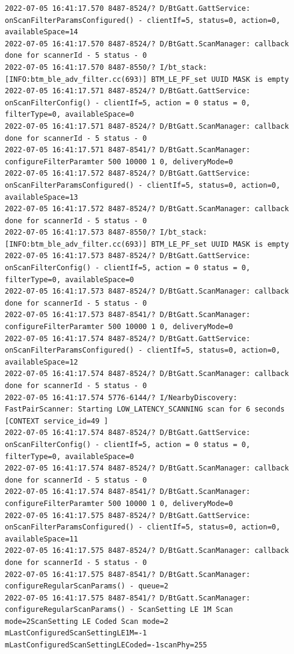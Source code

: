 \documentclass[a4paper,12pt]{book}
\begin{document}
\begin{lstlisting}
2022-07-05 16:41:17.570 8487-8524/? D/BtGatt.GattService: onScanFilterParamsConfigured() - clientIf=5, status=0, action=0, availableSpace=14
2022-07-05 16:41:17.570 8487-8524/? D/BtGatt.ScanManager: callback done for scannerId - 5 status - 0
2022-07-05 16:41:17.570 8487-8550/? I/bt_stack: [INFO:btm_ble_adv_filter.cc(693)] BTM_LE_PF_set UUID MASK is empty 
2022-07-05 16:41:17.571 8487-8524/? D/BtGatt.GattService: onScanFilterConfig() - clientIf=5, action = 0 status = 0, filterType=0, availableSpace=0
2022-07-05 16:41:17.571 8487-8524/? D/BtGatt.ScanManager: callback done for scannerId - 5 status - 0
2022-07-05 16:41:17.571 8487-8541/? D/BtGatt.ScanManager: configureFilterParamter 500 10000 1 0, deliveryMode=0
2022-07-05 16:41:17.572 8487-8524/? D/BtGatt.GattService: onScanFilterParamsConfigured() - clientIf=5, status=0, action=0, availableSpace=13
2022-07-05 16:41:17.572 8487-8524/? D/BtGatt.ScanManager: callback done for scannerId - 5 status - 0
2022-07-05 16:41:17.573 8487-8550/? I/bt_stack: [INFO:btm_ble_adv_filter.cc(693)] BTM_LE_PF_set UUID MASK is empty 
2022-07-05 16:41:17.573 8487-8524/? D/BtGatt.GattService: onScanFilterConfig() - clientIf=5, action = 0 status = 0, filterType=0, availableSpace=0
2022-07-05 16:41:17.573 8487-8524/? D/BtGatt.ScanManager: callback done for scannerId - 5 status - 0
2022-07-05 16:41:17.573 8487-8541/? D/BtGatt.ScanManager: configureFilterParamter 500 10000 1 0, deliveryMode=0
2022-07-05 16:41:17.574 8487-8524/? D/BtGatt.GattService: onScanFilterParamsConfigured() - clientIf=5, status=0, action=0, availableSpace=12
2022-07-05 16:41:17.574 8487-8524/? D/BtGatt.ScanManager: callback done for scannerId - 5 status - 0
2022-07-05 16:41:17.574 5776-6144/? I/NearbyDiscovery: FastPairScanner: Starting LOW_LATENCY_SCANNING scan for 6 seconds [CONTEXT service_id=49 ]
2022-07-05 16:41:17.574 8487-8524/? D/BtGatt.GattService: onScanFilterConfig() - clientIf=5, action = 0 status = 0, filterType=0, availableSpace=0
2022-07-05 16:41:17.574 8487-8524/? D/BtGatt.ScanManager: callback done for scannerId - 5 status - 0
2022-07-05 16:41:17.574 8487-8541/? D/BtGatt.ScanManager: configureFilterParamter 500 10000 1 0, deliveryMode=0
2022-07-05 16:41:17.575 8487-8524/? D/BtGatt.GattService: onScanFilterParamsConfigured() - clientIf=5, status=0, action=0, availableSpace=11
2022-07-05 16:41:17.575 8487-8524/? D/BtGatt.ScanManager: callback done for scannerId - 5 status - 0
2022-07-05 16:41:17.575 8487-8541/? D/BtGatt.ScanManager: configureRegularScanParams() - queue=2
2022-07-05 16:41:17.575 8487-8541/? D/BtGatt.ScanManager: configureRegularScanParams() - ScanSetting LE 1M Scan mode=2ScanSetting LE Coded Scan mode=2 mLastConfiguredScanSettingLE1M=-1 mLastConfiguredScanSettingLECoded=-1scanPhy=255

\end{lstlisting}
\end{document}
